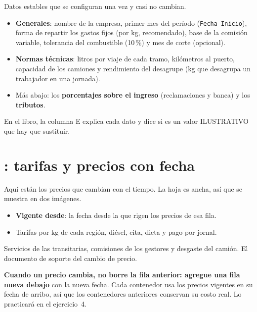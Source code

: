 Datos estables que se configuran una vez y casi no cambian.

\begin{itemize}
  \item {} \textbf{Generales}: nombre de la empresa, primer mes del período (\texttt{Fecha\_Inicio}), forma de repartir los gastos
        fijos (por kg, recomendado), base de la comisión variable, tolerancia del combustible (10\,\%) y mes de corte (opcional).
  \item {} \textbf{Normas técnicas}: litros por viaje de cada tramo, kilómetros al puerto, capacidad de los camiones y
        rendimiento del desagrupe (kg que desagrupa un trabajador en una jornada).
  \item Más abajo: los \textbf{porcentajes sobre el ingreso} (reclamaciones y banca) y los \textbf{tributos}.
\end{itemize}
En el libro, la columna E explica cada dato y dice si es un valor ILUSTRATIVO que hay que sustituir.

\section{: tarifas y precios con fecha}

Aquí están los precios que cambian con el tiempo. La hoja es ancha, así que se muestra en dos imágenes.

\begin{itemize}
  \item {} \textbf{Vigente desde}: la fecha desde la que rigen los precios de esa fila.
  \item {} Tarifas por kg de cada región, diésel, cita, dieta y pago por jornal.
\end{itemize}

 Servicios de las transitarias, comisiones de los gestores y desgaste del camión.  El documento de soporte del cambio de precio.

\begin{atencion}
\textbf{Cuando un precio cambia, no borre la fila anterior: agregue una fila nueva debajo} con la nueva fecha. Cada contenedor usa
los precios vigentes en su fecha de arribo, así que los contenedores anteriores conservan su costo real. Lo practicará en el ejercicio~4.
\end{atencion}

